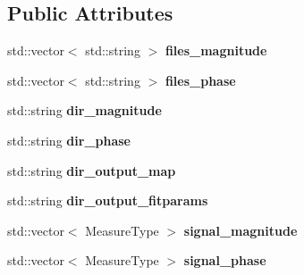 \subsection*{Public Attributes}
\begin{DoxyCompactItemize}
\item 
\hypertarget{struct_ox_1_1_tomato_options_ad123055506ec1c4c73b397a5f771d2e7}{std\-::vector$<$ std\-::string $>$ {\bfseries files\-\_\-magnitude}}\label{struct_ox_1_1_tomato_options_ad123055506ec1c4c73b397a5f771d2e7}

\item 
\hypertarget{struct_ox_1_1_tomato_options_acd13f26343647d05164a33cb5b4163f3}{std\-::vector$<$ std\-::string $>$ {\bfseries files\-\_\-phase}}\label{struct_ox_1_1_tomato_options_acd13f26343647d05164a33cb5b4163f3}

\item 
\hypertarget{struct_ox_1_1_tomato_options_aeffcb3fc69397596ce852699a2f3b05d}{std\-::string {\bfseries dir\-\_\-magnitude}}\label{struct_ox_1_1_tomato_options_aeffcb3fc69397596ce852699a2f3b05d}

\item 
\hypertarget{struct_ox_1_1_tomato_options_a92cabcc150b94b5b4c3dbea6e8ecb846}{std\-::string {\bfseries dir\-\_\-phase}}\label{struct_ox_1_1_tomato_options_a92cabcc150b94b5b4c3dbea6e8ecb846}

\item 
\hypertarget{struct_ox_1_1_tomato_options_af31a50b6e23004912a1512812c823a29}{std\-::string {\bfseries dir\-\_\-output\-\_\-map}}\label{struct_ox_1_1_tomato_options_af31a50b6e23004912a1512812c823a29}

\item 
\hypertarget{struct_ox_1_1_tomato_options_ab8e2816968affd97a0ba0b13c44c4c02}{std\-::string {\bfseries dir\-\_\-output\-\_\-fitparams}}\label{struct_ox_1_1_tomato_options_ab8e2816968affd97a0ba0b13c44c4c02}

\item 
\hypertarget{struct_ox_1_1_tomato_options_a657de7a6c7607a1727ed38d79306ecd1}{std\-::vector$<$ Measure\-Type $>$ {\bfseries signal\-\_\-magnitude}}\label{struct_ox_1_1_tomato_options_a657de7a6c7607a1727ed38d79306ecd1}

\item 
\hypertarget{struct_ox_1_1_tomato_options_a76d334a72a2e2df16e140441cc79ab3e}{std\-::vector$<$ Measure\-Type $>$ {\bfseries signal\-\_\-phase}}\label{struct_ox_1_1_tomato_options_a76d334a72a2e2df16e140441cc79ab3e}


\end{DoxyCompactItemize}
